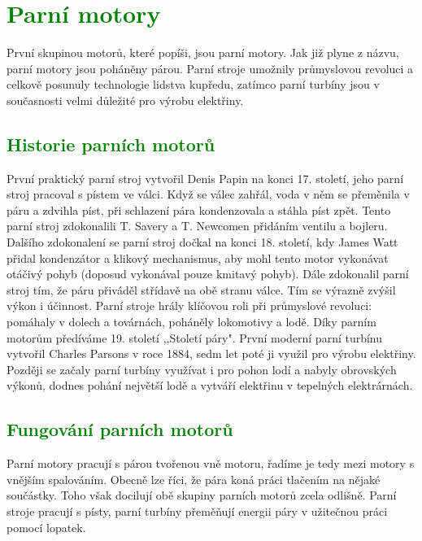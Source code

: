 \section{\textcolor{green}{Parní motory}}
{První skupinou motorů, které popíši, jsou parní motory. Jak již plyne z názvu, parní motory jsou poháněny párou. Parní stroje umožnily průmyslovou revoluci a celkově posunuly technologie lidstva kupředu, zatímco parní turbíny jsou v současnosti velmi důležité pro výrobu elektřiny.}

\subsection{\textcolor{green}{Historie parních motorů}}
{První praktický parní stroj vytvořil Denis Papin na konci 17. století, jeho parní stroj pracoval s pístem ve válci. Když se válec zahřál, voda v něm se přeměnila v páru a zdvihla píst, při schlazení pára kondenzovala a stáhla píst zpět. Tento parní stroj zdokonalili T. Savery a T. Newcomen přidáním ventilu a bojleru. Dalšího zdokonalení se parní stroj dočkal na konci 18. století, kdy James Watt přidal kondenzátor a klikový mechanismus, aby mohl tento motor vykonávat otáčivý pohyb (doposud vykonával pouze kmitavý pohyb). Dále zdokonalil parní stroj tím, že páru přiváděl střídavě na obě stranu válce. Tím se výrazně zvýšil výkon i účinnost. Parní stroje hrály klíčovou roli při průmyslové revoluci: pomáhaly v dolech a továrnách, poháněly lokomotivy a lodě. Díky parním motorům předíváme 19. století ,,Století páry".}
\cite{st:parniStroj}\odst
{První moderní parní turbínu vytvořil Charles Parsons v roce 1884, sedm let poté ji využil pro výrobu elektřiny. Později se začaly parní turbíny využívat i pro pohon lodí a nabyly obrovských výkonů, dodnes pohání největší lodě a vytváří elektřinu v tepelných elektrárnách.}
\cite{SA:SteamTurbines}

\subsection{\textcolor{green}{Fungování parních motorů}}
{Parní motory pracují s párou tvořenou vně motoru, řadíme je tedy mezi motory s vnějším spalováním. Obecně lze říci, že pára koná práci tlačením na nějaké součástky. Toho však docilují obě skupiny parních motorů zcela odlišně. Parní stroje pracují s písty, parní turbíny přeměňují energii páry v užitečnou práci pomocí lopatek.}

